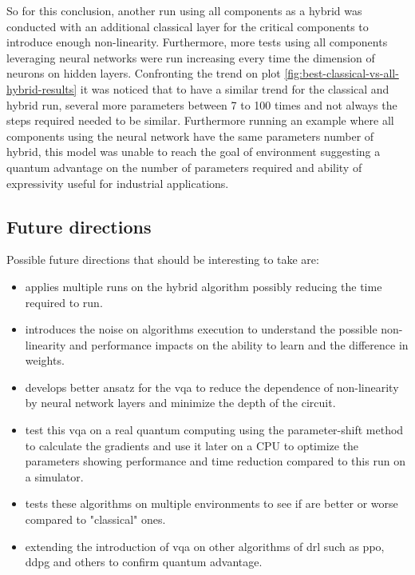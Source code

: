 So for this conclusion, another run using all components as a hybrid was conducted with an additional classical layer for the critical components to introduce enough non-linearity. Furthermore, more tests using all components leveraging neural networks were run increasing every time the dimension of neurons on hidden layers.
Confronting the trend on plot \ref{fig:best-classical-vs-all-hybrid-results} it was noticed that to have a similar trend for the classical and hybrid run, several more parameters between 7 to 100 times and not always the steps required needed to be similar. 
Furthermore running an example where all components using the neural network have the same parameters number of hybrid, this model was unable to reach the goal of environment suggesting a quantum advantage on the number of parameters required and ability of expressivity useful for industrial applications.
\subsection{Future directions}
Possible future directions that should be interesting to take are:
\begin{itemize}
	\item applies multiple runs on the hybrid algorithm possibly reducing the time required to run.
	\item introduces the noise on algorithms execution to understand the possible non-linearity and performance impacts on the ability to learn and the difference in weights.
	\item develops better ansatz for the \acrshort{vqa} to reduce the dependence of non-linearity by neural network layers and minimize the depth of the circuit.
	\item test this \acrshort{vqa} on a real quantum computing using the parameter-shift method to calculate the gradients and use it later on a CPU to optimize the parameters showing performance and time reduction compared to this run on a simulator.
	\item tests these algorithms on multiple environments to see if are better or worse compared to "classical" ones.
	\item extending the introduction of \acrshort{vqa} on other algorithms of \acrshort{drl} such as \acrshort{ppo}, \acrshort{ddpg} and others to confirm quantum advantage.
\end{itemize}